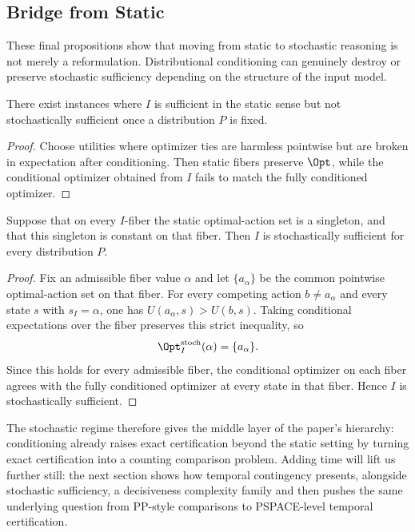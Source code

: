 \subsection{Bridge from Static}

These final propositions show that moving from static to stochastic reasoning is not merely a reformulation. Distributional conditioning can genuinely destroy or preserve stochastic sufficiency depending on the structure of the input model.

\begin{proposition}\label{prop:static-not-stochastic}
There exist instances where $I$ is sufficient in the static sense but not stochastically sufficient once a distribution $P$ is fixed.
\end{proposition}


\begin{proof}
Choose utilities where optimizer ties are harmless pointwise but are broken in expectation after conditioning. Then static fibers preserve $\Opt$, while the conditional optimizer obtained from $I$ fails to match the fully conditioned optimizer.
\end{proof}

\begin{proposition}\label{prop:static-to-stochastic-product}
Suppose that on every $I$-fiber the static optimal-action set is a singleton, and that this singleton is constant on that fiber. Then $I$ is stochastically sufficient for every distribution $P$.
\end{proposition}


\begin{proof}
Fix an admissible fiber value $\alpha$ and let $\{a_\alpha\}$ be the common pointwise optimal-action set on that fiber. For every competing action $b \ne a_\alpha$ and every state $s$ with $s_I=\alpha$, one has $U(a_\alpha,s) > U(b,s)$. Taking conditional expectations over the fiber preserves this strict inequality, so
\[
\Opt^{\mathrm{stoch}}_I(\alpha)=\{a_\alpha\}.
\]
Since this holds for every admissible fiber, the conditional optimizer on each fiber agrees with the fully conditioned optimizer at every state in that fiber. Hence $I$ is stochastically sufficient.
\end{proof}

The stochastic regime therefore gives the middle layer of the paper's hierarchy:
conditioning already raises exact certification beyond the static setting by
turning exact certification into a counting comparison problem. Adding time
will lift us further still: the next section shows how temporal contingency
presents, alongside stochastic sufficiency, a decisiveness complexity family and then pushes the same underlying question from PP-style comparisons to
PSPACE-level temporal certification.
